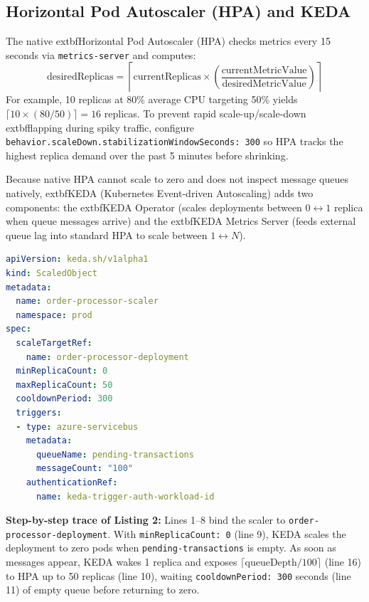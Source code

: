 \subsection{Horizontal Pod Autoscaler (HPA) and KEDA}
The native 	extbf{Horizontal Pod Autoscaler (HPA)} checks metrics every 15 seconds via \texttt{metrics-server} and computes:
\begin{equation}
\text{desiredReplicas} = \left\lceil \text{currentReplicas} \times \left( \frac{\text{currentMetricValue}}{\text{desiredMetricValue}} \right) \right\rceil
\end{equation}
For example, 10 replicas at 80\% average CPU targeting 50\% yields $\lceil 10 \times (80 / 50) \rceil = 16$ replicas. To prevent rapid scale-up/scale-down 	extbf{flapping} during spiky traffic, configure \texttt{behavior.scaleDown.stabilizationWindowSeconds: 300} so HPA tracks the highest replica demand over the past 5 minutes before shrinking.

Because native HPA cannot scale to zero and does not inspect message queues natively, 	extbf{KEDA (Kubernetes Event-driven Autoscaling)} adds two components: the 	extbf{KEDA Operator} (scales deployments between $0 \leftrightarrow 1$ replica when queue messages arrive) and the 	extbf{KEDA Metrics Server} (feeds external queue lag into standard HPA to scale between $1 \leftrightarrow N$).

\begin{lstlisting}[language=yaml, caption={KEDA ScaledObject Scaling from Zero on Azure Service Bus Lag}]
apiVersion: keda.sh/v1alpha1
kind: ScaledObject
metadata:
  name: order-processor-scaler
  namespace: prod
spec:
  scaleTargetRef:
    name: order-processor-deployment
  minReplicaCount: 0
  maxReplicaCount: 50
  cooldownPeriod: 300
  triggers:
  - type: azure-servicebus
    metadata:
      queueName: pending-transactions
      messageCount: "100"
    authenticationRef:
      name: keda-trigger-auth-workload-id
\end{lstlisting}

\textbf{Step-by-step trace of Listing 2:} Lines 1--8 bind the scaler to \texttt{order-processor-deployment}. With \texttt{minReplicaCount: 0} (line 9), KEDA scales the deployment to zero pods when \texttt{pending-transactions} is empty. As soon as messages appear, KEDA wakes 1 replica and exposes $\lceil \text{queueDepth} / 100 \rceil$ (line 16) to HPA up to 50 replicas (line 10), waiting \texttt{cooldownPeriod: 300} seconds (line 11) of empty queue before returning to zero.

